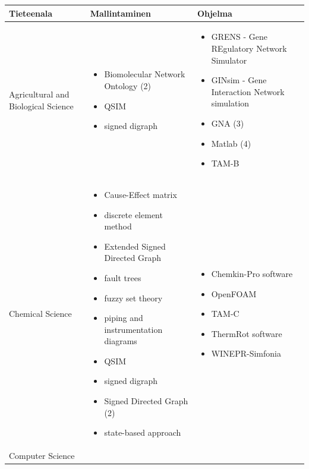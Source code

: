 \documentclass[utf8]{gradu3}
\begin{document}
\begin{longtable}[h]{|p{4cm}|p{6cm}|p{5cm}|}
    \hline
    \textbf{Tieteenala}    &    \textbf{Mallintaminen} & \textbf{Ohjelma}\\
    \hline
    Agricultural and Biological Science & \begin{itemize}
        \item Biomolecular Network Ontology (2)
        \item QSIM
        \item signed digraph
    \end{itemize} &
    \begin{itemize}
        \item GRENS - Gene REgulatory Network Simulator
        \item GINsim - Gene Interaction Network simulation
        \item GNA (3)
        \item Matlab (4)
        \item TAM-B
    \end{itemize} 
    \\
    \hline
    Chemical Science & \begin{itemize}
        \item Cause-Effect matrix
        \item discrete element method
        \item Extended Signed Directed Graph
        \item fault trees
        \item fuzzy set theory
        \item piping and instrumentation diagrams
        \item QSIM
        \item signed digraph
        \item Signed Directed Graph (2)       
        \item state-based approach
    \end{itemize} & 
    \begin{itemize}
        \item Chemkin-Pro software
        \item OpenFOAM
        \item TAM-C
        \item ThermRot software
        \item WINEPR-Simfonia
    \end{itemize}
    \\
    \hline
    Computer Science & \begin{itemize}

\end{itemize}
\end{longtable}
\end{document}
